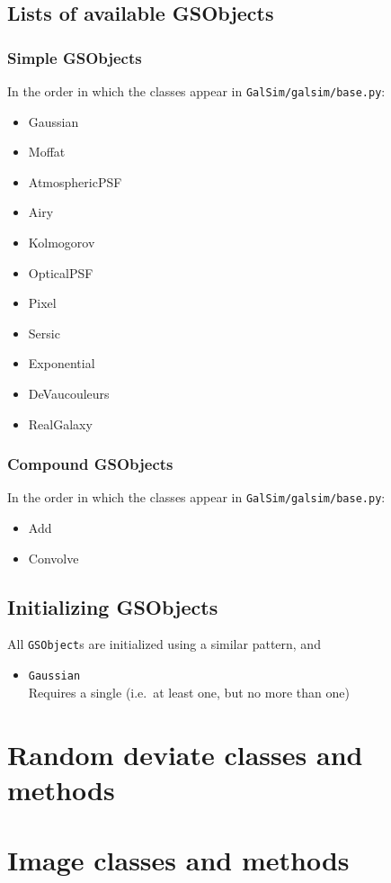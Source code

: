 \documentclass[preprint,10pt]{aastex}
\newcommand{\gsobject}{{\tt GSObject}}
\begin{document}
\subsection{Lists of available GSObjects}
\subsubsection*{Simple GSObjects}
In the order in which the classes
appear in {\tt GalSim/galsim/base.py}:
\begin{itemize}
\item[] Gaussian
\item[] Moffat
\item[] AtmosphericPSF
\item[] Airy
\item[] Kolmogorov
\item[] OpticalPSF
\item[] Pixel
\item[] Sersic
\item[] Exponential
\item[] DeVaucouleurs
\item[] RealGalaxy
\end{itemize}

\subsubsection*{Compound GSObjects}
In the order in which the classes
appear in {\tt GalSim/galsim/base.py}:
\begin{itemize}
\item[] Add
\item[] Convolve
\end{itemize}

\subsection{Initializing GSObjects}
All \gsobject s are initialized using a similar pattern, and

\begin{itemize}
\item {\tt Gaussian} \\
  Requires a single (i.e.\ at least one, but no more than one) 
\end{itemize}

\section{Random deviate classes and methods}\label{sect:random}


\section{Image classes and methods}\label{sect:image}
\end{document}
